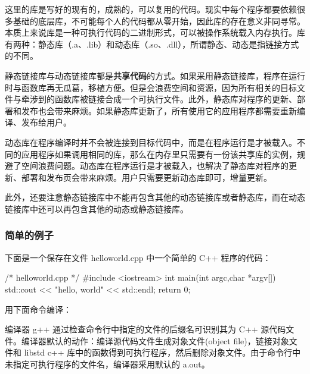 这里的库是写好的现有的，成熟的，可以复用的代码。现实中每个程序都要依赖很多基础的底层库，不可能每个人的代码都从零开始，因此库的存在意义非同寻常。本质上来说库是一种可执行代码的二进制形式，可以被操作系统载入内存执行。库有两种：静态库（.a、.lib）和动态库（.so、.dll），所谓静态、动态是指链接方式的不同。

静态链接库与动态链接库都是\textbf{共享代码}的方式。如果采用静态链接库，程序在运行时与函数库再无瓜葛，移植方便。但是会浪费空间和资源，因为所有相关的目标文件与牵涉到的函数库被链接合成一个可执行文件。此外，静态库对程序的更新、部署和发布也会带来麻烦。如果静态库更新了，所有使用它的应用程序都需要重新编译、发布给用户。

动态库在程序编译时并不会被连接到目标代码中，而是在程序运行是才被载入。不同的应用程序如果调用相同的库，那么在内存里只需要有一份该共享库的实例，规避了空间浪费问题。动态库在程序运行是才被载入，也解决了静态库对程序的更新、部署和发布页会带来麻烦。用户只需要更新动态库即可，增量更新。

此外，还要注意静态链接库中不能再包含其他的动态链接库或者静态库，而在动态链接库中还可以再包含其他的动态或静态链接库。

\subsubsection{简单的例子} 

下面是一个保存在文件 helloworld.cpp 中一个简单的 C++ 程序的代码：
\begin{Code}
    /* helloworld.cpp */
    #include <iostream>
    int main(int argc,char *argv[])
    {
        std::cout << "hello, world" << std::endl;
        return 0;
    }
\end{Code}

用下面命令编译：

编译器 g++ 通过检查命令行中指定的文件的后缀名可识别其为 C++ 源代码文件。编译器默认的动作：编译源代码文件生成对象文件(object file)，链接对象文件和 libstd c++ 库中的函数得到可执行程序，然后删除对象文件。由于命令行中未指定可执行程序的文件名，编译器采用默认的 a.out。

